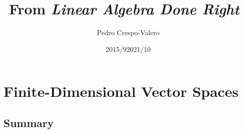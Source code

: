 \documentclass[11pt,notitlepage,oneside]{article}
\author{Pedro Crespo-Valero}
\begin{document}
\title{From \emph{Linear Algebra Done Right}~\cite{Axler1997}}
\date{2015/9}
\date{2021/10}
\maketitle

\tableofcontents

\newpage
\setcounter{section}{0}





\newpage
\section{Finite-Dimensional Vector Spaces}
\subsection*{Summary}
\end{document}
